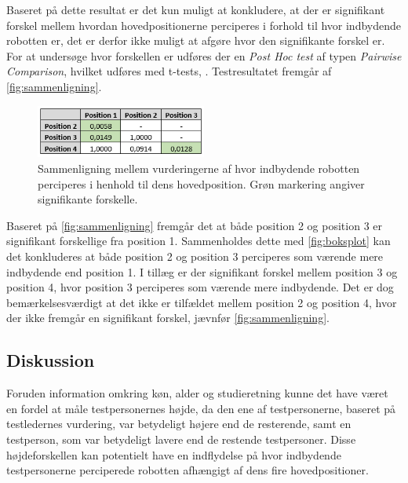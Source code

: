 Baseret på dette resultat er det kun muligt at konkludere, at der er signifikant forskel mellem hvordan hovedpositionerne perciperes i forhold til hvor indbydende robotten er, det er derfor ikke muligt at afgøre hvor den signifikante forskel er. For at undersøge hvor forskellen er udføres der en \textit{Post Hoc test} af typen \textit{Pairwise Comparison}, hvilket udføres med t-tests, \parencite[s. 1338]{DiscoveringStatisticsUsingR}. Testresultatet fremgår af \autoref{fig:sammenligning}.
%
\begin{figure}[H]
\centering
\includegraphics[width = 0.5\textwidth]{Figure/PostHocExcel.PNG} 
\caption{Sammenligning mellem vurderingerne af hvor indbydende robotten perciperes i henhold til dens hovedposition. Grøn markering angiver signifikante forskelle.}
\label{fig:sammenligning}
\end{figure}
\noindent
%
Baseret på \autoref{fig:sammenligning} fremgår det at både position 2 og position 3 er signifikant forskellige fra position 1. Sammenholdes dette med \autoref{fig:boksplot} kan det konkluderes at både position 2 og position 3 perciperes som værende mere indbydende end position 1. I tillæg er der signifikant forskel mellem position 3 og position 4, hvor position 3 perciperes som værende mere indbydende. Det er dog bemærkelsesværdigt at det ikke er tilfældet mellem position 2 og position 4, hvor der ikke fremgår en signifikant forskel, jævnfør \autoref{fig:sammenligning}.
%

\subsection*{Diskussion}
\label{Diskussion}
%
Foruden information omkring køn, alder og studieretning kunne det have været en fordel at måle testpersonernes højde, da den ene af testpersonerne, baseret på testledernes vurdering, var betydeligt højere end de resterende, samt en testperson, som var betydeligt lavere end de restende testpersoner. Disse højdeforskellen kan potentielt have en indflydelse på hvor indbydende testpersonerne perciperede robotten afhængigt af dens fire hovedpositioner. 

